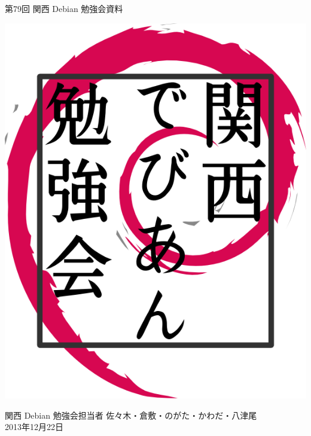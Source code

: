 \documentclass[mingoth,a4paper]{jsarticle}
\newcommand{\debmtgyear}{2013}
\newcommand{\debmtgdate}{22}
\newcommand{\debmtgmonth}{12}
\newcommand{\debmtgnumber}{79}
\begin{document}
\begin{titlepage}


 第\debmtgnumber{}回 関西 Debian 勉強会資料

\vspace{2cm}

\begin{center}
\includegraphics{image200802/kansaidebianlogo.png}
\end{center}

\begin{flushright}
\hfill{}関西 Debian 勉強会担当者 佐々木・倉敷・のがた・かわだ・八津尾 \\
\hfill{}\debmtgyear{}年\debmtgmonth{}月\debmtgdate{}日
\end{flushright}

\thispagestyle{empty}
\end{titlepage}


\vspace{1em}
\end{document}
